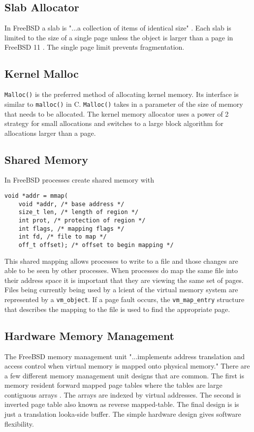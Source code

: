 \subsection{Slab Allocator}
In FreeBSD a slab is "...a collection of items of identical size" \cite{Freebsdtext}. Each slab is limited to the size of a single page unless the object is larger than a page in FreeBSD 11 \cite{Freebsdtext}. The single page limit prevents fragmentation. 

\subsection{Kernel Malloc}
\lstinline{Malloc()} is the preferred method of allocating kernel memory. Its interface is similar to \lstinline{malloc()} in C. \lstinline{Malloc()} takes in a parameter of the size of memory that needs to be allocated. The kernel memory allocator uses a power of 2 strategy for small allocations and switches to a large block algorithm for allocations larger than a page.

\subsection{Shared Memory}
In FreeBSD processes create shared memory with
\begin{lstlisting}
void *addr = mmap(
    void *addr, /* base address */
    size_t len, /* length of region */
    int prot, /* protection of region */
    int flags, /* mapping flags */
    int fd, /* file to map */
    off_t offset); /* offset to begin mapping */
\end{lstlisting}
This shared mapping allows processes to write to a file and those changes are able to be seen by other processes. When processes do  map the same file into their address space it is important that they are viewing the same set of pages. Files being currently being used by a lcient of the virtual memory system are represented by a \lstinline{vm_object}\cite{Freebsdtext}. If a page fault occurs, the \lstinline{vm_map_entry} structure that describes the mapping to the file is used to find the appropriate page. 

\subsection{Hardware Memory Management}
The FreeBSD memory management unit "...implements address translation and access control when virtual memory is mapped onto physical memory."\cite{Freebsdtext} There are a few different memory management unit designs that are common. The first is memory resident forward mapped page tables where the tables are large contiguous arrays \cite{Freebsdtext}. The arrays are indexed by virtual addresses. The second is inverted page table also known as reverse mapped-table. The final design is is just a translation looka-side buffer. The simple hardware design gives software flexibility.
